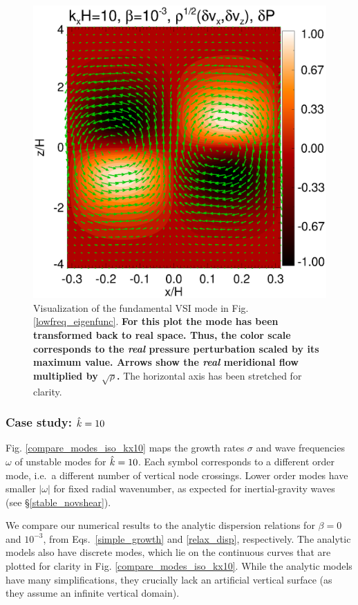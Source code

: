 \begin{figure}
  \includegraphics[width=\linewidth]{figures/result2d_iso}
  \caption{Visualization of the fundamental VSI mode in
    Fig. \ref{lowfreq_eigenfunc}. {\bf For this plot the mode has been
    transformed back to real space. Thus, the color scale corresponds to the
    \emph{real} 
    pressure perturbation scaled by its maximum value.
    Arrows show the \emph{real} meridional flow  multiplied by
    $\sqrt{\rho}$.}
  The horizontal axis has been stretched 
    for clarity.  
    \label{lowfreq_eigenfunc_2d}
  }
\end{figure}

\subsubsection{Case study: $\hat{k}=10$}\label{k10}
Fig. \ref{compare_modes_iso_kx10} maps the growth rates $\sigma$ and
wave frequencies $\omega$ of unstable 
modes for $\hat{k}=10$.  Each symbol 
corresponds to a different order mode, i.e.\ a different number of vertical node crossings.  Lower order modes
have smaller $|\omega|$ for fixed radial wavenumber, as expected for
inertial-gravity waves (see \S\ref{stable_novshear}).  

We compare our numerical results to the analytic dispersion relations for 
$\beta = 0$ and $10^{-3}$, from Eqs.\ \ref{simple_growth} and
\ref{relax_disp}, respectively.   The analytic models also have
discrete modes, which lie on the continuous curves that are plotted
for clarity in Fig. \ref{compare_modes_iso_kx10}.   While the analytic
models have many simplifications, they crucially lack an artificial
vertical surface (as they assume an infinite vertical domain).   

